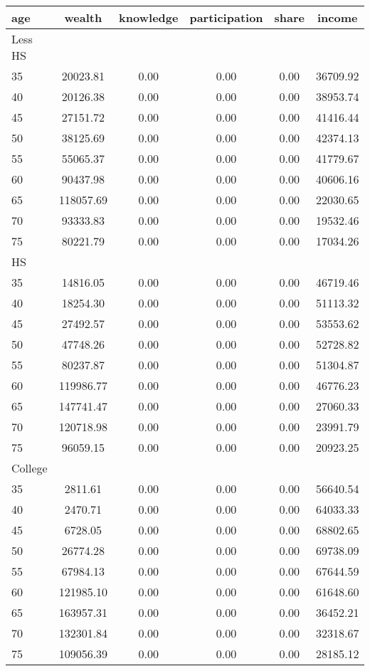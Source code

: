  \begin{tabular}{lccccc}
 \hline \hline
  age & wealth & knowledge & participation & share & income \\
 \hline
 Less HS & & & & & \\
 \hline
35 &  20023.81 &      0.00 &      0.00 &      0.00 &  36709.92 \\ 
40 &  20126.38 &      0.00 &      0.00 &      0.00 &  38953.74 \\ 
45 &  27151.72 &      0.00 &      0.00 &      0.00 &  41416.44 \\ 
50 &  38125.69 &      0.00 &      0.00 &      0.00 &  42374.13 \\ 
55 &  55065.37 &      0.00 &      0.00 &      0.00 &  41779.67 \\ 
60 &  90437.98 &      0.00 &      0.00 &      0.00 &  40606.16 \\ 
65 & 118057.69 &      0.00 &      0.00 &      0.00 &  22030.65 \\ 
70 &  93333.83 &      0.00 &      0.00 &      0.00 &  19532.46 \\ 
75 &  80221.79 &      0.00 &      0.00 &      0.00 &  17034.26 \\ 
 \hline
 HS & & & & & \\
 \hline
35 &  14816.05 &      0.00 &      0.00 &      0.00 &  46719.46 \\ 
40 &  18254.30 &      0.00 &      0.00 &      0.00 &  51113.32 \\ 
45 &  27492.57 &      0.00 &      0.00 &      0.00 &  53553.62 \\ 
50 &  47748.26 &      0.00 &      0.00 &      0.00 &  52728.82 \\ 
55 &  80237.87 &      0.00 &      0.00 &      0.00 &  51304.87 \\ 
60 & 119986.77 &      0.00 &      0.00 &      0.00 &  46776.23 \\ 
65 & 147741.47 &      0.00 &      0.00 &      0.00 &  27060.33 \\ 
70 & 120718.98 &      0.00 &      0.00 &      0.00 &  23991.79 \\ 
75 &  96059.15 &      0.00 &      0.00 &      0.00 &  20923.25 \\ 
 \hline
 College & & & & & \\
 \hline
35 &   2811.61 &      0.00 &      0.00 &      0.00 &  56640.54 \\ 
40 &   2470.71 &      0.00 &      0.00 &      0.00 &  64033.33 \\ 
45 &   6728.05 &      0.00 &      0.00 &      0.00 &  68802.65 \\ 
50 &  26774.28 &      0.00 &      0.00 &      0.00 &  69738.09 \\ 
55 &  67984.13 &      0.00 &      0.00 &      0.00 &  67644.59 \\ 
60 & 121985.10 &      0.00 &      0.00 &      0.00 &  61648.60 \\ 
65 & 163957.31 &      0.00 &      0.00 &      0.00 &  36452.21 \\ 
70 & 132301.84 &      0.00 &      0.00 &      0.00 &  32318.67 \\ 
75 & 109056.39 &      0.00 &      0.00 &      0.00 &  28185.12 \\ 
 \hline \hline
 \end{tabular}
